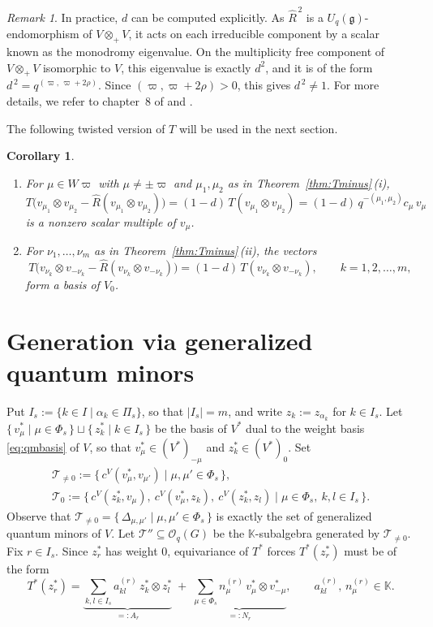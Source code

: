 \documentclass[12pt]{amsart}
\theoremstyle{plain}
\newtheorem{corollary}[theorem]{Corollary}
\theoremstyle{remark}
\newtheorem{remark}[theorem]{Remark}
\newcommand{\g}{\mathfrak{g}}
\newcommand{\Uq}{U_q(\g)}
\newcommand{\ot}{\otimes}
\newcommand{\vp}{\varpi}
\newcommand{\Rhat}{\widehat{R}}
\newcommand{\Phis}{\Phi_{s}}
\newcommand{\Pis}{\Pi_{s}}
\newcommand{\K}{\mathbb{K}}
\begin{document}
\begin{remark}\label{rem:d}
In practice, $d$ can be computed explicitly. As $\Rhat^{\,2}$ is a $\Uq$-endomorphism
of $V\ot_+V$, it acts on each irreducible component by a scalar known as the monodromy eigenvalue. On the multiplicity free component of $V\ot_+ V$ isomorphic to $V$, this eigenvalue is exactly $d^2$, and it is of the form $d^{\,2}=q^{(\vp,\,\vp+2\rho)}$. Since $(\vp,\vp+2\rho)>0$, this gives $d^{\,2}\neq1$. For more details, we
refer to chapter~8 of \cite[Corollary 23]{KS} and \cite{Gould}.
\end{remark}

The following twisted version of $T$ will be used in the next section.

\begin{corollary}\label{cor:extract}
\leavevmode
\begin{enumerate}
\item[\rm(i)] For $\mu\in W\vp$ with $\mu\neq\pm\vp$ and $\mu_1,\mu_2$ as in
Theorem~\ref{thm:Tminus}\,{\rm(i)},
\[
T\big(v_{\mu_1}\ot v_{\mu_2}-\Rhat(v_{\mu_1}\ot v_{\mu_2})\big)
=(1-d)\,T(v_{\mu_1}\ot v_{\mu_2})
=(1-d)\,q^{-(\mu_1,\mu_2)}c_\mu\,v_\mu
\]
is a nonzero scalar multiple of $v_\mu$.
\item[\rm(ii)] For $\nu_1,\dots,\nu_m$ as in Theorem~\ref{thm:Tminus}\,{\rm(ii)},
the vectors
\[
T\big(v_{\nu_k}\ot v_{-\nu_k}-\Rhat(v_{\nu_k}\ot v_{-\nu_k})\big)
=(1-d)\,T(v_{\nu_k}\ot v_{-\nu_k}),\qquad k=1,2,\dots,m,
\]
form a basis of $V_0$.
\end{enumerate}
\end{corollary}

\section{Generation via generalized quantum minors}\label{sec:minors}

Put $I_s:=\{k\in I\mid\alpha_k\in\Pis\}$, so that $|I_s|=m$, and write
$z_k:=z_{\alpha_k}$ for $k\in I_s$. Let
$\{\,v_\mu^*\mid\mu\in\Phis\,\}\sqcup\{\,z_k^*\mid k\in I_s\,\}$
be the basis of $V^*$ dual to the weight basis \eqref{eq:qmbasis} of $V$, so that
$v_\mu^*\in(V^*)_{-\mu}$ and $z_k^*\in(V^*)_0$. Set
\begin{gather*}
\mathscr{T}_{\neq0}:=\{\,c^V(v_\mu^*,v_{\mu'})\mid\mu,\mu'\in\Phis\,\},\\
\mathscr{T}_0:=\{\,c^V(z_k^*,v_\mu),\ c^V(v_\mu^*,z_k),\ c^V(z_k^*,z_l)
\mid\mu\in\Phis,\ k,l\in I_s\,\}.
\end{gather*}
Observe that $\mathscr{T}_{\neq0}=\{\,\Delta_{\mu,\mu'}\mid\mu,\mu'\in\Phis\,\}$
is exactly the set of generalized quantum minors of $V$. Let $\mathscr{T}''\subseteq \mathcal{O}_q(G)$ be the
$\K$-subalgebra generated by $\mathscr{T}_{\neq0}$. Fix $r\in I_s$. Since $z_r^*$ has weight $0$, equivariance of $T^*$ forces
$T^*(z_r^*)$ must be of the form
\begin{equation}\label{eq:dagger}
T^*(z_r^*)=\underbrace{\sum_{k,l\in I_s} a^{(r)}_{kl}\,z_k^*\ot z_l^*}_{=:A_r}
\;+\;\underbrace{\sum_{\mu\in\Phis} n^{(r)}_{\mu}\,v_{\mu}^*\ot v_{-\mu}^*}_{=:N_r},
\qquad a^{(r)}_{kl},\,n^{(r)}_{\mu}\in\K .
\end{equation}
\end{document}
